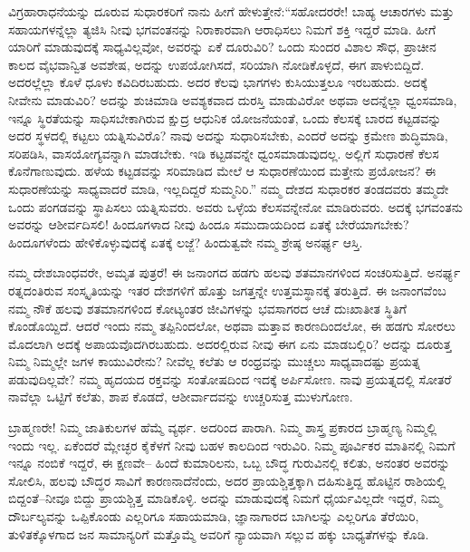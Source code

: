 ವಿಗ್ರಹಾರಾಧನೆಯನ್ನು ದೂರುವ ಸುಧಾರಕರಿಗೆ ನಾನು ಹೀಗೆ ಹೇಳುತ್ತೇನೆ:\break “ಸಹೋದರರೇ! ಬಾಹ್ಯ ಆಚಾರಗಳು ಮತ್ತು ಸಹಾಯಗಳನ್ನೆಲ್ಲಾ ತ್ಯಜಿಸಿ ನೀವು ಭಗವಂತನನ್ನು ನಿರಾಕಾರವಾಗಿ ಆರಾಧಿಸಲು ನಿಮಗೆ ಶಕ್ತಿ ಇದ್ದರೆ ಮಾಡಿ. ಹೀಗೆ ಯಾರಿಗೆ ಮಾಡುವುದಕ್ಕೆ ಸಾಧ್ಯವಿಲ್ಲವೋ, ಅವರನ್ನು ಏಕೆ ದೂರುವಿರಿ? ಒಂದು ಸುಂದರ ವಿಶಾಲ ಸೌಧ, ಪ್ರಾಚೀನ ಕಾಲದ ವೈಭವಾನ್ವಿತ ಅವಶೇಷ, ಅದನ್ನು ಉಪಯೋಗಿಸದೆ, ಸರಿಯಾಗಿ ನೋಡಿಕೊಳ್ಳದೆ, ಈಗ ಪಾಳುಬಿದ್ದಿದೆ. ಅದರಲ್ಲೆಲ್ಲಾ ಕೊಳೆ ಧೂಳು ಕವಿದಿರಬಹುದು. ಅದರ ಕೆಲವು ಭಾಗಗಳು ಕುಸಿಯುತ್ತಲೂ ಇರಬಹುದು. ಅದಕ್ಕೆ ನೀವೇನು ಮಾಡುವಿರಿ? ಅದನ್ನು ಶುಚಿಮಾಡಿ ಅವಶ್ಯಕವಾದ ದುರಸ್ತಿ ಮಾಡುವಿರೋ ಅಥವಾ ಅದನ್ನೆಲ್ಲಾ ಧ್ವಂಸಮಾಡಿ, ಇನ್ನೂ ಸ್ಥಿರತೆಯನ್ನು ಸಾಧಿಸಬೇಕಾಗಿರುವ ಕ್ಷುದ್ರ ಆಧುನಿಕ ಯೋಜನೆಯಂತೆ, ಒಂದು ಕೆಲಸಕ್ಕೆ ಬಾರದ ಕಟ್ಟಡವನ್ನು ಅದರ ಸ್ಥಳದಲ್ಲಿ ಕಟ್ಟಲು ಯತ್ನಿಸುವಿರೊ? ನಾವು ಅದನ್ನು ಸುಧಾರಿಸಬೇಕು, ಎಂದರೆ ಅದನ್ನು ಕ್ರಮೇಣ ಶುದ್ಧಿಮಾಡಿ, ಸರಿಪಡಿಸಿ, ವಾಸಯೋಗ್ಯವನ್ನಾಗಿ ಮಾಡಬೇಕು. ಇಡಿ ಕಟ್ಟಡವನ್ನೇ ಧ್ವಂಸಮಾಡುವುದಲ್ಲ. ಅಲ್ಲಿಗೆ ಸುಧಾರಣೆ ಕೆಲಸ ಕೊನೆಗಾಣುವುದು. ಹಳೆಯ ಕಟ್ಟಡವನ್ನು ಸರಿಮಾಡಿದ ಮೇಲೆ ಆ ಸುಧಾರಣೆಯಿಂದ ಮತ್ತೇನು ಪ್ರಯೋಜನ? ಈ ಸುಧಾರಣೆಯನ್ನು ಸಾಧ್ಯವಾದರೆ ಮಾಡಿ, ಇಲ್ಲದಿದ್ದರೆ ಸುಮ್ಮನಿರಿ.” ನಮ್ಮ ದೇಶದ ಸುಧಾರಕರ ತಂಡದವರು ತಮ್ಮದೇ ಒಂದು ಪಂಗಡವನ್ನು ಸ್ಥಾಪಿಸಲು ಯತ್ನಿಸುವರು. ಅವರು ಒಳ್ಳೆಯ ಕೆಲಸವನ್ನೇನೋ ಮಾಡಿರುವರು. ಅದಕ್ಕೆ ಭಗವಂತನು ಅವರನ್ನು ಆಶೀರ್ವದಿಸಲಿ! ಹಿಂದೂಗಳಾದ ನೀವು ಹಿಂದೂ ಸಮುದಾಯದಿಂದ ಏತಕ್ಕೆ ಬೇರೆಯಾಗಬೇಕು? ಹಿಂದೂಗಳೆಂದು ಹೇಳಿಕೊಳ್ಳುವುದಕ್ಕೆ ಏತಕ್ಕೆ ಲಜ್ಜೆ? ಹಿಂದುತ್ವವೇ ನಮ್ಮ ಶ್ರೇಷ್ಠ ಅನರ್ಘ್ಯ ಆಸ್ತಿ.

ನಮ್ಮ ದೇಶಬಾಂಧವರೇ, ಅಮೃತ ಪುತ್ರರೆ! ಈ ಜನಾಂಗದ ಹಡಗು ಹಲವು ಶತಮಾನಗಳಿಂದ ಸಂಚರಿಸುತ್ತಿದೆ. ಅನರ್ಘ್ಯ ರತ್ನದಂತಿರುವ ಸಂಸ್ಕೃತಿಯನ್ನು ಇತರ ದೇಶಗಳಿಗೆ ಹೊತ್ತು ಜಗತ್ತನ್ನೇ ಉತ್ತಮಸ್ಥಾನಕ್ಕೆ ತರುತ್ತಿದೆ. ಈ ಜನಾಂಗವೆಂಬ ನಮ್ಮ ನೌಕೆ ಹಲವು ಶತಮಾನಗಳಿಂದ ಕೋಟ್ಯಂತರ ಜೀವಿಗಳನ್ನು ಭವಸಾಗರದ ಆಚೆ ದುಃಖಾತೀತ ಸ್ಥಿತಿಗೆ ಕೊಂಡೊಯ್ದಿದೆ. ಆದರೆ ಇಂದು ನಮ್ಮ ತಪ್ಪಿನಿಂದಲೋ, ಅಥವಾ ಮತ್ತಾವ ಕಾರಣದಿಂದಲೋ, ಈ ಹಡಗು ಸೋರಲು ಮೊದಲಾಗಿ ಅದಕ್ಕೆ ಅಪಾಯವೊದಗಿರಬಹುದು. ಅದರಲ್ಲಿರುವ ನೀವು ಈಗ ಏನು ಮಾಡಬಲ್ಲಿರಿ? ಅದನ್ನು ದೂರುತ್ತ ನಿಮ್ಮ ನಿಮ್ಮಲ್ಲೇ ಜಗಳ ಕಾಯುವಿರೇನು? ನೀವೆಲ್ಲ ಕಲೆತು ಆ ರಂಧ್ರವನ್ನು ಮುಚ್ಚಲು ಸಾಧ್ಯವಾದಷ್ಟು ಪ್ರಯತ್ನ ಪಡುವುದಿಲ್ಲವೇ? ನಮ್ಮ ಹೃದಯದ ರಕ್ತವನ್ನು ಸಂತೋಷದಿಂದ ಇದಕ್ಕೆ ಅರ್ಪಿಸೋಣ. ನಾವು ಪ್ರಯತ್ನದಲ್ಲಿ ಸೋತರೆ ನಾವೆಲ್ಲಾ ಒಟ್ಟಿಗೆ ಕಲೆತು, ಶಾಪ ಕೊಡದೆ, ಆಶೀರ್ವಾದವನ್ನು ಉಚ್ಚರಿಸುತ್ತ ಮುಳುಗೋಣ.

ಬ್ರಾಹ್ಮಣರೇ! ನಿಮ್ಮ ಜಾತಿಕುಲಗಳ ಹೆಮ್ಮೆ ವ್ಯರ್ಥ. ಅದರಿಂದ ಪಾರಾಗಿ. ನಿಮ್ಮ ಶಾಸ್ತ್ರ ಪ್ರಕಾರದ ಬ್ರಾಹ್ಮಣ್ಯ ನಿಮ್ಮಲ್ಲಿ ಇಂದು ಇಲ್ಲ. ಏಕೆಂದರೆ ಮ್ಲೇಚ್ಛರ ಕೈಕೆಳಗೆ ನೀವು ಬಹಳ ಕಾಲದಿಂದ ಇರುವಿರಿ. ನಿಮ್ಮ ಪೂರ್ವಿಕರ ಮಾತಿನಲ್ಲಿ ನಿಮಗೆ ಇನ್ನೂ ನಂಬಿಕೆ ಇದ್ದರೆ, ಈ ಕ್ಷಣವೇ– ಹಿಂದೆ ಕುಮಾರಿಲನು, ಒಬ್ಬ ಬೌದ್ಧ ಗುರುವಿನಲ್ಲಿ ಕಲಿತು, ಅನಂತರ ಅವರನ್ನು ಸೋಲಿಸಿ, ಹಲವು ಬೌದ್ಧರ ಸಾವಿಗೆ ಕಾರಣನಾದೆನೆಂದು, ಅದರ ಪ್ರಾಯಶ್ಚಿತ್ತಕ್ಕಾಗಿ ದಹಿಸುತ್ತಿದ್ದ ಹೊಟ್ಟಿನ ರಾಶಿಯಲ್ಲಿ ಬಿದ್ದಂತೆ–ನೀವೂ ಬಿದ್ದು ಪ್ರಾಯಶ್ಚಿತ್ತ ಮಾಡಿಕೊಳ್ಳಿ. ಅದನ್ನು ಮಾಡುವುದಕ್ಕೆ ನಿಮಗೆ ಧೈರ್ಯವಿಲ್ಲದೇ ಇದ್ದರೆ, ನಿಮ್ಮ ದೌರ್ಬಲ್ಯವನ್ನು ಒಪ್ಪಿಕೊಂಡು ಎಲ್ಲರಿಗೂ ಸಹಾಯಮಾಡಿ, ಜ್ಞಾನಾಗಾರದ ಬಾಗಿಲನ್ನು ಎಲ್ಲರಿಗೂ ತೆರೆಯಿರಿ, ತುಳಿತಕ್ಕೊಳಗಾದ ಜನ ಸಾಮಾನ್ಯರಿಗೆ ಮತ್ತೊಮ್ಮೆ ಅವರಿಗೆ ನ್ಯಾಯವಾಗಿ ಸಲ್ಲುವ ಹಕ್ಕು ಬಾಧ್ಯತೆಗಳನ್ನು ಕೊಡಿ.

